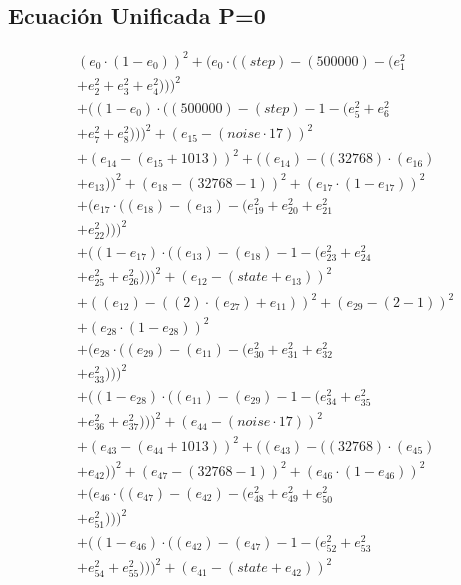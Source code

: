 \documentclass[10pt, a4paper]{article}
\begin{document}
\subsection*{Ecuación Unificada P=0}
\begin{align*}
& (e_{0}  \cdot  (1 - e_{0}))^{2} + (e_{0}  \cdot  ((step) - (500000) - (e_{1}^{2} \\
& + e_{2}^{2} + e_{3}^{2} + e_{4}^{2})))^{2} \\
& + ((1 - e_{0})  \cdot  ((500000) - (step) - 1 - (e_{5}^{2} + e_{6}^{2} \\
& + e_{7}^{2} + e_{8}^{2})))^{2} + (e_{15} - (noise  \cdot  17))^{2} \\
& + (e_{14} - (e_{15} + 1013))^{2} + ((e_{14}) - ((32768)  \cdot  (e_{16}) \\
& + e_{13}))^{2} + (e_{18} - (32768 - 1))^{2} + (e_{17}  \cdot  (1 - e_{17}))^{2} \\
& + (e_{17}  \cdot  ((e_{18}) - (e_{13}) - (e_{19}^{2} + e_{20}^{2} + e_{21}^{2} \\
& + e_{22}^{2})))^{2} \\
& + ((1 - e_{17})  \cdot  ((e_{13}) - (e_{18}) - 1 - (e_{23}^{2} + e_{24}^{2} \\
& + e_{25}^{2} + e_{26}^{2})))^{2} + (e_{12} - (state + e_{13}))^{2} \\
& + ((e_{12}) - ((2)  \cdot  (e_{27}) + e_{11}))^{2} + (e_{29} - (2 - 1))^{2} \\
& + (e_{28}  \cdot  (1 - e_{28}))^{2} \\
& + (e_{28}  \cdot  ((e_{29}) - (e_{11}) - (e_{30}^{2} + e_{31}^{2} + e_{32}^{2} \\
& + e_{33}^{2})))^{2} \\
& + ((1 - e_{28})  \cdot  ((e_{11}) - (e_{29}) - 1 - (e_{34}^{2} + e_{35}^{2} \\
& + e_{36}^{2} + e_{37}^{2})))^{2} + (e_{44} - (noise  \cdot  17))^{2} \\
& + (e_{43} - (e_{44} + 1013))^{2} + ((e_{43}) - ((32768)  \cdot  (e_{45}) \\
& + e_{42}))^{2} + (e_{47} - (32768 - 1))^{2} + (e_{46}  \cdot  (1 - e_{46}))^{2} \\
& + (e_{46}  \cdot  ((e_{47}) - (e_{42}) - (e_{48}^{2} + e_{49}^{2} + e_{50}^{2} \\
& + e_{51}^{2})))^{2} \\
& + ((1 - e_{46})  \cdot  ((e_{42}) - (e_{47}) - 1 - (e_{52}^{2} + e_{53}^{2} \\
& + e_{54}^{2} + e_{55}^{2})))^{2} + (e_{41} - (state + e_{42}))^{2} \\

\end{align*}
\end{document}

